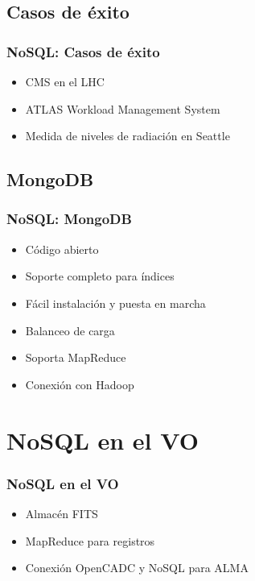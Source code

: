 \documentclass[serif,12pt]{beamer}
\begin{document}
\subsection{Casos de éxito}
\begin{frame}
\frametitle{NoSQL: Casos de éxito}

\begin{itemize}
\item CMS en el LHC
\item ATLAS Workload Management System
\item Medida de niveles de radiación en Seattle
\end{itemize}


\end{frame}



\subsection{MongoDB}
\begin{frame}
\frametitle{NoSQL: MongoDB}

\begin{itemize}
\item Código abierto
\item Soporte completo para índices
\item Fácil instalación y puesta en marcha
\item Balanceo de carga
\item Soporta MapReduce
\item Conexión con Hadoop
\end{itemize}


\end{frame}

\section{NoSQL en el VO}
\begin{frame}
\frametitle{NoSQL en el VO}

\begin{itemize}
\item Almacén FITS
\item MapReduce para registros
\item Conexión OpenCADC y NoSQL para ALMA
\end{itemize}


\end{frame}
\end{document}
